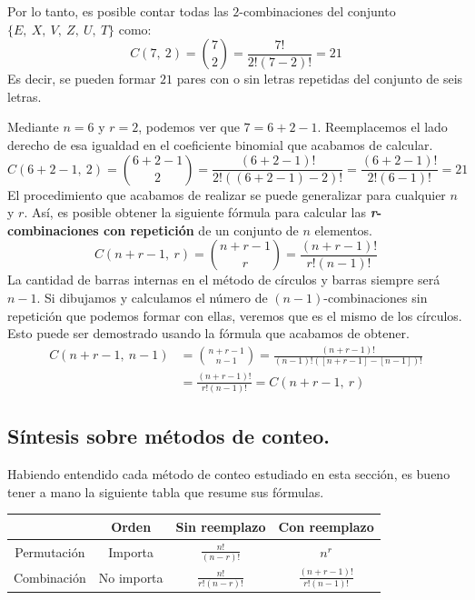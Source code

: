 \documentclass[12pt]{article}
\begin{document}
Por lo tanto, es posible contar todas las $2$-combinaciones del conjunto $\{E, \ X, \ V, \ Z, \ U, \ T\}$ como:
\[
  C(7, \ 2) = \binom{7}{2} = \frac{7!}{2! (7 - 2)!} = 21
\]
Es decir, se pueden formar $21$ pares con o sin letras repetidas del conjunto de seis letras.

Mediante $n = 6$ y $r = 2$, podemos ver que $7 = 6 + 2 - 1$. Reemplacemos el lado derecho de esa igualdad en el coeficiente binomial que acabamos de calcular.
\[
  C(6 + 2 - 1, \ 2) = \binom{6 + 2 - 1}{2}
                    = \frac{(6 + 2 - 1)!}{2! ((6 + 2 - 1) - 2)!}
                    = \frac{(6 + 2 - 1)!}{2! (6 - 1)!}
                    = 21
\]
El procedimiento que acabamos de realizar se puede generalizar para cualquier $n$ y $r$. Así, es posible obtener la siguiente fórmula para calcular las \textbf{\textit{r}-combinaciones con repetición} de un conjunto de $n$ elementos.
\[
  C(n + r - 1, \ r) = \binom{n + r - 1}{r} = \frac{(n + r - 1)!}{r!(n - 1)!}
\]
La cantidad de barras internas en el método de círculos y barras siempre será $n - 1$. Si dibujamos y calculamos el número de $(n - 1)$-combinaciones sin repetición que podemos formar con ellas, veremos que es el mismo de los círculos. Esto puede ser demostrado usando la fórmula que acabamos de obtener.
\begin{align*}
  C(n + r - 1, \ n - 1) &= \binom{n + r - 1}{n - 1}
                        = \frac{(n + r - 1)!}{(n - 1)!([n + r - 1] - [n - 1])!} \\
                        &= \frac{(n + r - 1)!}{r!(n - 1)!}
                        = C(n + r - 1, \ r)
\end{align*}

\subsection{Síntesis sobre métodos de conteo.}

Habiendo entendido cada método de conteo estudiado en esta sección, es bueno tener a mano la siguiente tabla que resume sus fórmulas.

\newpage

\begin{table}[hbt!]
\centering
\renewcommand{\arraystretch}{1.7}

\begin{tabular}{c|c c c}
            & Orden & Sin reemplazo & Con reemplazo \\
\hline
Permutación & Importa & $\displaystyle \frac{n!}{(n - r)!}$ & $n^{r}$ \\
Combinación & No importa & $\displaystyle \frac{n!}{r!(n - r)!}$ & $\displaystyle \frac{(n + r - 1)!}{r!(n - 1)!}$
\end{tabular}

\end{table}
\end{document}
